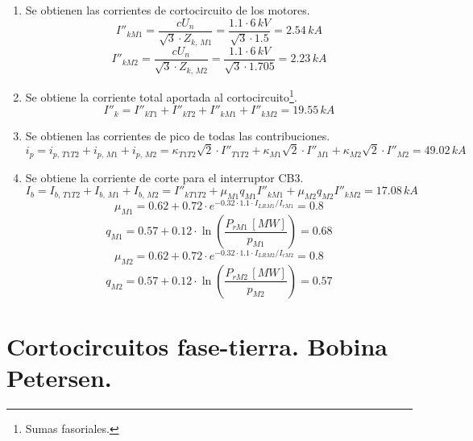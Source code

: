 \begin{enumerate}
                    \item Se obtienen las corrientes de cortocircuito de los motores.
                        $$I''_\textit{kM1} = \dfrac{cU_\textit{n}}{\sqrt{3}\cdot Z_\textit{k, M1}} = \dfrac{1.1\cdot 6\,\textit{kV}}{\sqrt{3}\cdot 1.5} = 2.54\,\textit{kA}$$
                        $$I''_\textit{kM2} = \dfrac{cU_\textit{n}}{\sqrt{3}\cdot Z_\textit{k, M2}} = \dfrac{1.1\cdot 6\,\textit{kV}}{\sqrt{3}\cdot 1.705} = 2.23\,\textit{kA}$$

                    \item Se obtiene la corriente total aportada al cortocircuito\footnote{Sumas fasoriales.}.
                        $$I''_\textit{k} = I''_\textit{kT1} + I''_\textit{kT2} + I''_\textit{kM1} + I''_\textit{kM2} = 19.55\,\textit{kA}$$

                    \item Se obtienen las corrientes de pico de todas las contribuciones.
                        $$i_\textit{p} = i_\textit{p, T1T2} + i_\textit{p, M1} + i_\textit{p, M2} = \kappa_\textit{T1T2} \sqrt{2}\cdot I''_\textit{T1T2} + \kappa_\textit{M1}\sqrt{2}\cdot I''_\textit{M1} + \kappa_\textit{M2}\sqrt{2}\cdot I''_\textit{M2} = 49.02\,\textit{kA}$$

                    \item Se obtiene la corriente de corte para el interruptor CB3.
                        $$I_\textit{b} = I_\textit{b, T1T2} + I_\textit{b, M1} + I_\textit{b, M2} = I''_\textit{kT1T2} + \mu_\textit{M1}q_\textit{M1}I''_\textit{kM1} + \mu_\textit{M2}q_\textit{M2}I''_\textit{kM2} = 17.08\,\textit{kA}$$
                        $$\mu_\textit{M1} = 0.62+0.72\cdot e^{-0.32\cdot 1.1\cdot I_\textit{LRM1}/I_\textit{rM1}} = 0.8$$
                        $$q_\textit{M1} = 0.57+0.12\cdot \ln\left(\dfrac{P_\textit{rM1}\,[\textit{MW}]}{p_\textit{M1}}\right) = 0.68$$
                        $$\mu_\textit{M2} = 0.62+0.72\cdot e^{-0.32\cdot 1.1\cdot I_\textit{LRM2}/I_\textit{rM2}} = 0.8$$
                        $$q_\textit{M2} = 0.57+0.12\cdot \ln\left(\dfrac{P_\textit{rM2}\,[\textit{MW}]}{p_\textit{M2}}\right) = 0.57$$
                \end{enumerate}

    \section{Cortocircuitos fase-tierra. Bobina Petersen.}
